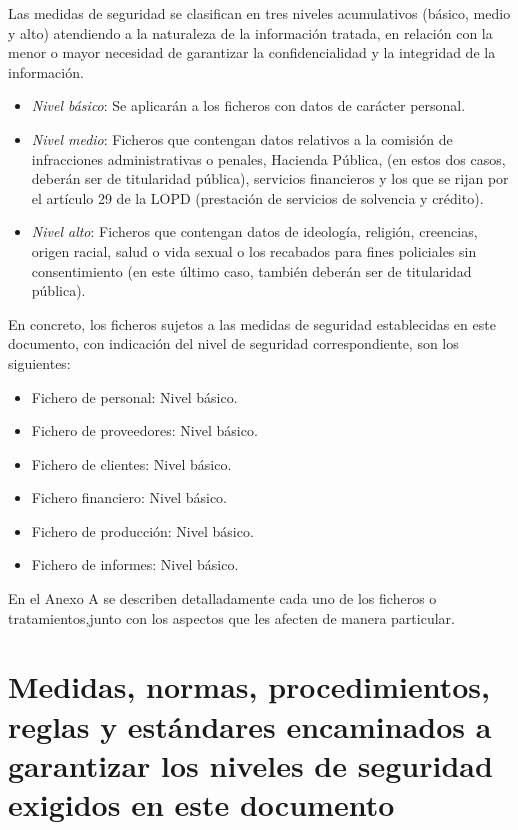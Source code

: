 \documentclass[a4paper,11pt,bibtotoc,noliststotoc]{scrbook}
\begin{document}
Las medidas de seguridad se clasifican en tres niveles acumulativos (básico, medio y alto) atendiendo a la naturaleza de la información tratada, en relación con la menor o mayor necesidad de garantizar la confidencialidad y la integridad de la información.

\begin{itemize}
\item \emph{Nivel básico}: Se aplicarán a los ficheros con datos de carácter personal.

\item \emph{Nivel medio}: Ficheros que contengan datos relativos a la comisión de infracciones administrativas o penales, Hacienda Pública, (en estos dos casos, deberán ser de titularidad pública), servicios financieros y los que se rijan por el artículo 29 de la LOPD (prestación de servicios de solvencia y crédito).

\item \emph{Nivel alto}: Ficheros que contengan datos de ideología, religión, creencias, origen racial, salud o vida sexual o los recabados para fines policiales sin consentimiento (en este último caso, también deberán ser de titularidad pública).
\end{itemize}

En concreto, los ficheros sujetos a las medidas de seguridad establecidas en este documento, con indicación del nivel de seguridad correspondiente, son los siguientes:
\begin{itemize}
	\item Fichero de personal: Nivel básico.
	\item Fichero de proveedores: Nivel básico.
	\item Fichero de clientes: Nivel básico.
	\item Fichero financiero: Nivel básico.
	\item Fichero de producción: Nivel básico.
	\item Fichero de informes: Nivel básico.
\end{itemize}

En el Anexo A se describen detalladamente cada uno de los ficheros o tratamientos,junto con los aspectos que les afecten de manera particular.





\chapter{Medidas, normas, procedimientos, reglas y estándares encaminados a garantizar los niveles de seguridad exigidos en este documento}
\end{document}
